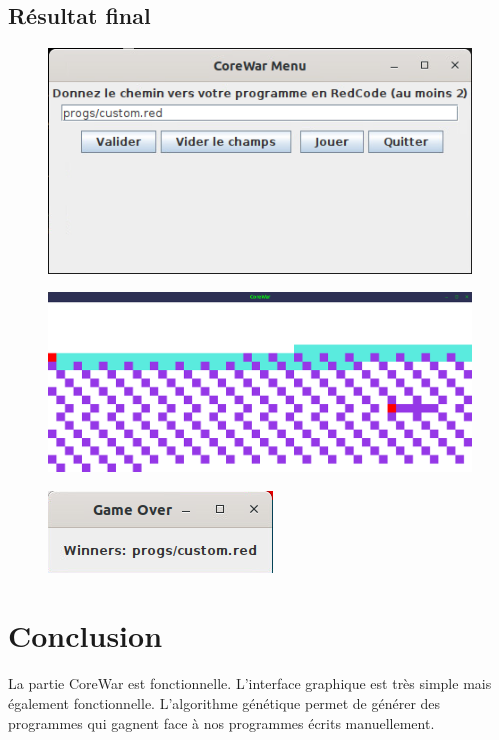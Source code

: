 \documentclass[a4paper,12pt]{article} %
\begin{document}
\subsection{Résultat final}
\begin{figure}[hb]
\centering
\includegraphics[scale=0.6]{images/mainMenu.png}
\label{menu}

\includegraphics[scale=0.3]{images/jeu.png}
\label{jeu}

\includegraphics[scale=0.7]{images/gameOver.png}
\label{over}
\end{figure}

\newpage
\section{Conclusion}

La partie CoreWar est fonctionnelle. L'interface graphique est très simple mais également fonctionnelle. L'algorithme génétique permet de générer des programmes qui gagnent face à nos programmes écrits manuellement.
\end{document}
